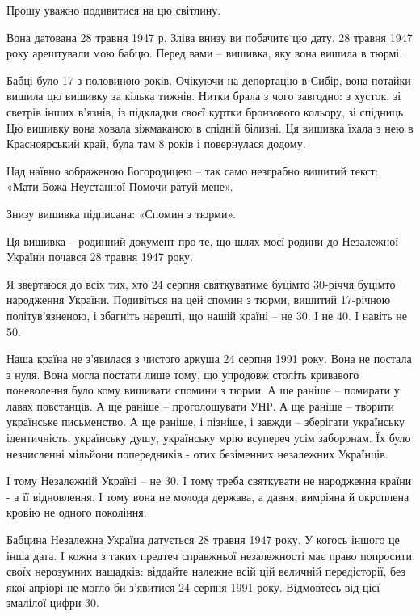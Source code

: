 \begin{multicols}{2}

Прошу уважно подивитися на цю світлину.  

Вона датована 28 травня 1947 р. Зліва внизу ви побачите цю дату. 28 травня 1947
року арештували мою бабцю. Перед вами – вишивка, яку вона вишила в тюрмі. 

Бабці було 17 з половиною років. Очікуючи на депортацію в Сибір, вона потайки
вишила цю вишивку за кілька тижнів. Нитки брала з чого завгодно: з хусток, зі
светрів інших в’язнів, із підкладки своєї  куртки бронзового кольору, зі
спідниць. Цю вишивку вона ховала зіжмаканою в спідній білизні. Ця вишивка їхала
з нею в Красноярський край, була там 8 років і повернулася додому. 

Над наївно зображеною Богородицею – так само незграбно вишитий текст: «Мати
Божа Неустанної Помочи ратуй мене». 

Знизу вишивка підписана: «Спомин з тюрми».

Ця вишивка – родинний документ про те, що шлях моєї родини до Незалежної
України почався 28 травня 1947 року.

Я звертаюся до всіх тих, хто 24 серпня святкуватиме буцімто 30-річчя буцімто
народження України. Подивіться на цей спомин з тюрми, вишитий 17-річною
політув'язненою, і збагніть нарешті, що нашій країні – не 30. І не 40. І навіть
не 50. 

Наша країна не з’явилася з чистого аркуша 24 серпня 1991 року. Вона не постала
з нуля. Вона могла постати лише тому, що упродовж століть кривавого поневолення
було кому вишивати спомини з тюрми. А ще раніше – помирати у лавах повстанців.
А ще раніше – проголошувати УНР. А ще раніше – творити українське письменство.
А ще раніше, і пізніше, і завжди – зберігати українську ідентичність,
українську душу, українську  мрію всупереч усім заборонам. Їх було незчисленні
мільйони попередників - отих безіменних незалежних Українців. 

І тому Незалежній Україні – не 30. І тому треба святкувати не народження країни
- а її відновлення. І тому вона не молода держава, а давня, вимріяна й
окроплена кровію не одного покоління. 

Бабцина Незалежна Україна датується 28 травня 1947 року. У когось іншого це
інша дата. І кожна з таких предтеч справжньої незалежності має право попросити
своїх нерозумних нащадків: віддайте належне всій цій величній передісторії, без
якої апріорі не могло би з’явитися 24 серпня 1991 року. Відмовтесь від цієї
змалілої цифри 30. 


\end{multicols}
